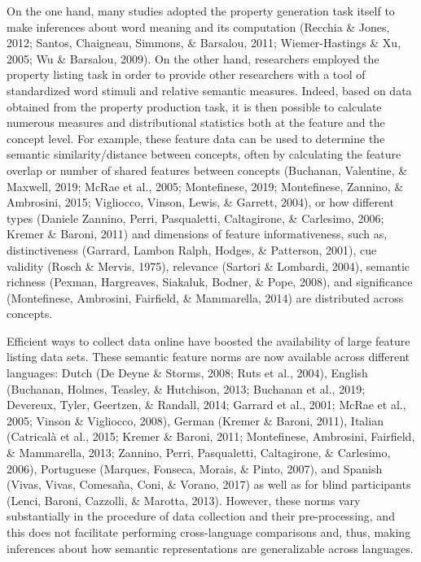 \documentclass[man]{apa6}
\begin{document}
On the one hand, many studies adopted the property generation task itself to make inferences about word meaning and its computation (Recchia \& Jones, 2012; Santos, Chaigneau, Simmons, \& Barsalou, 2011; Wiemer-Hastings \& Xu, 2005; Wu \& Barsalou, 2009). On the other hand, researchers employed the property listing task in order to provide other researchers with a tool of standardized word stimuli and relative semantic measures. Indeed, based on data obtained from the property production task, it is then possible to calculate numerous measures and distributional statistics both at the feature and the concept level. For example, these feature data can be used to determine the semantic similarity/distance between concepts, often by calculating the feature overlap or number of shared features between concepts (Buchanan, Valentine, \& Maxwell, 2019; McRae et al., 2005; Montefinese, 2019; Montefinese, Zannino, \& Ambrosini, 2015; Vigliocco, Vinson, Lewis, \& Garrett, 2004), or how different types (Daniele Zannino, Perri, Pasqualetti, Caltagirone, \& Carlesimo, 2006; Kremer \& Baroni, 2011) and dimensions of feature informativeness, such as, distinctiveness (Garrard, Lambon Ralph, Hodges, \& Patterson, 2001), cue validity (Rosch \& Mervis, 1975), relevance (Sartori \& Lombardi, 2004), semantic richness (Pexman, Hargreaves, Siakaluk, Bodner, \& Pope, 2008), and significance (Montefinese, Ambrosini, Fairfield, \& Mammarella, 2014) are distributed across concepts.

Efficient ways to collect data online have boosted the availability of large feature listing data sets. These semantic feature norms are now available across different languages: Dutch (De Deyne \& Storms, 2008; Ruts et al., 2004), English (Buchanan, Holmes, Teasley, \& Hutchison, 2013; Buchanan et al., 2019; Devereux, Tyler, Geertzen, \& Randall, 2014; Garrard et al., 2001; McRae et al., 2005; Vinson \& Vigliocco, 2008), German (Kremer \& Baroni, 2011), Italian (Catricalà et al., 2015; Kremer \& Baroni, 2011; Montefinese, Ambrosini, Fairfield, \& Mammarella, 2013; Zannino, Perri, Pasqualetti, Caltagirone, \& Carlesimo, 2006), Portuguese (Marques, Fonseca, Morais, \& Pinto, 2007), and Spanish (Vivas, Vivas, Comesaña, Coni, \& Vorano, 2017) as well as for blind participants (Lenci, Baroni, Cazzolli, \& Marotta, 2013). However, these norms vary substantially in the procedure of data collection and their pre-processing, and this does not facilitate performing cross-language comparisons and, thus, making inferences about how semantic representations are generalizable across languages.
\end{document}
